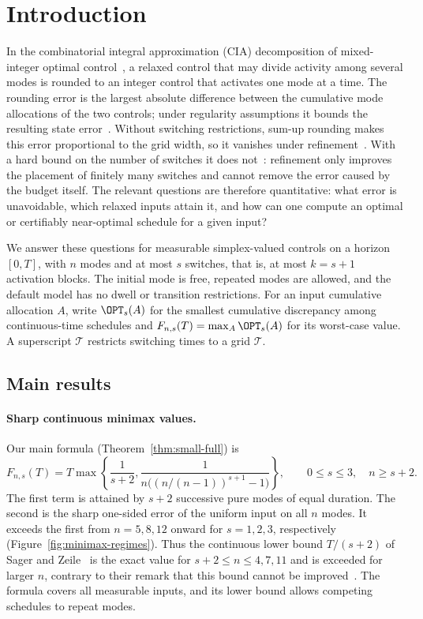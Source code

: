 \section{Introduction}\label{sec:introduction}

In the combinatorial integral approximation (CIA) decomposition of
mixed-integer optimal control~\cite{sager2011cia}, a relaxed control that may
divide activity among several modes is rounded to an integer control that
activates one mode at a time. The rounding error is the largest absolute
difference between the cumulative mode allocations of the two controls; under
regularity assumptions it bounds the resulting state
error~\cite{sager2011cia,zeile2022decomposition}. Without switching
restrictions, sum-up rounding makes this error proportional to the grid width,
so it vanishes under refinement~\cite{sager2011cia,kirches2020tight}. With a
hard bound on the number of switches it does not~\cite{sager-zeile2021}:
refinement only improves the placement of finitely many switches and cannot
remove the error caused by the budget itself. The relevant questions are
therefore quantitative: what error is unavoidable, which relaxed inputs attain
it, and how can one compute an optimal or certifiably near-optimal schedule
for a given input?

We answer these questions for measurable simplex-valued controls on a horizon
$[0,T]$, with $n$ modes and at most $s$ switches, that is, at most $k=s+1$
activation blocks. The initial mode is free, repeated modes are allowed, and
the default model has no dwell or transition restrictions. For an input
cumulative allocation $A$, write $\OPT_s(A)$ for the smallest cumulative
discrepancy among continuous-time schedules and $F_{n,s}(T)=\max_A\OPT_s(A)$
for its worst-case value. A superscript $\mathcal T$ restricts switching times
to a grid $\mathcal T$.

\subsection{Main results}

\paragraph{Sharp continuous minimax values.}
Our main formula (Theorem~\ref{thm:small-full}) is
\begin{equation}\label{eq:intro-main}
 F_{n,s}(T)=T\max\left\{\frac{1}{s+2},
 \frac{1}{n\bigl((n/(n-1))^{s+1}-1\bigr)}\right\},
 \qquad 0\le s\le3,\quad n\ge s+2.
\end{equation}
The first term is attained by $s+2$ successive pure modes of equal duration.
The second is the sharp one-sided error of the uniform input on all $n$
modes. It exceeds the first from $n=5,8,12$ onward for $s=1,2,3$,
respectively (Figure~\ref{fig:minimax-regimes}). Thus the continuous lower
bound $T/(s+2)$ of Sager and Zeile~\cite[Proposition~4]{sager-zeile2021} is
the exact value for $s+2\le n\le4,7,11$ and is exceeded for larger $n$,
contrary to their remark that this bound cannot be
improved~\cite[p.~615]{sager-zeile2021}. The
formula covers all measurable inputs, and its lower bound allows competing
schedules to repeat modes.

